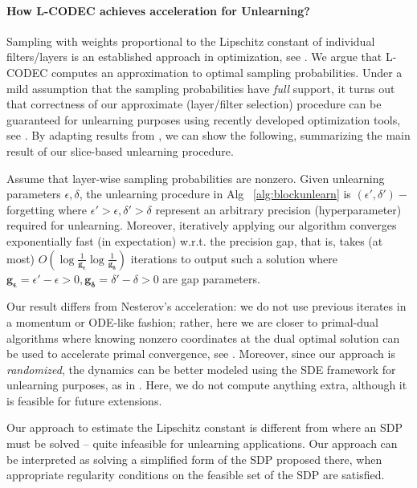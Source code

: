 \paragraph{How L-CODEC achieves acceleration for Unlearning?}
Sampling with weights proportional to the Lipschitz constant of individual filters/layers is an established approach in optimization, see \cite{gorbunov2020unified}. We argue that L-CODEC computes an approximation to optimal sampling probabilities.
Under a mild assumption that the sampling probabilities have \emph{full} support, it turns out that correctness of our approximate (layer/filter selection) procedure can be guaranteed for unlearning purposes using recently developed optimization tools, see \cite{gower2019sgd}. By adapting results from \cite{gorbunov2020unified}, we can show the following, summarizing the main result of our slice-based unlearning procedure.
\begin{theorem}\label{thm:fociconv}
Assume that layer-wise sampling probabilities are nonzero. Given unlearning parameters $\epsilon,\delta$, the unlearning procedure in Alg~ \ref{alg:blockunlearn} is $(\epsilon',\delta')-$forgetting where $\epsilon'>\epsilon,\delta'>\delta$ represent an arbitrary  precision (hyperparameter) required for unlearning. Moreover, iteratively applying our algorithm converges exponentially fast (in expectation) w.r.t. the precision gap, that is, takes (at most) $O(\log\frac{1}{\mathbf{g_{\epsilon}}}\log\frac{1}{\mathbf{g_{\delta}}})$ iterations to output such a solution where  $\mathbf{g_{\epsilon}} = \epsilon'-\epsilon>0,\mathbf{g_{\delta}}=\delta'-\delta>0$ are gap parameters.
\end{theorem}
Our result differs from Nesterov's acceleration: we do not use previous iterates in a momentum or ODE-like fashion; rather, here we are closer to primal-dual algorithms where knowing nonzero coordinates at the dual optimal solution  
can be used to accelerate primal convergence, see \cite{diakonikolas2019approximate}. Moreover, since our approach is \textit{randomized}, the dynamics can be better modeled using the SDE framework for unlearning purposes, as in \cite{simsekli2020fractional}. 
Here, we do not  compute anything extra, although it is feasible for future extensions.
\begin{remark}
Our approach to estimate the Lipschitz constant is different from \cite{fazlyab2019efficient} where an SDP must be solved -- quite infeasible for unlearning applications. Our approach can be interpreted as solving a simplified form of the SDP proposed there, when appropriate regularity conditions on the feasible set of the SDP are satisfied. %
\end{remark}

